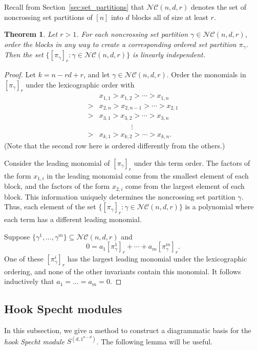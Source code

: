 \documentclass[10pt]{amsart}
\theoremstyle{definition}
\theoremstyle{plain}
\theoremstyle{plain}
\theoremstyle{definition}
\theoremstyle{remark}
\theoremstyle{plain}
\newtheorem{theorem}[cdrthm]{Theorem}
\theoremstyle{plain}
\theoremstyle{plain}
\numberwithin{equation}{section}
\newcommand{\nc}{\mathcal{NC}}
\begin{document}
Recall from Section~\ref{sec:set_partitions} that $\nc(n,d,r)$ denotes the set of noncrossing set partitions of $[n]$ into $d$ blocks all of size at least $r$.

\begin{theorem}\label{thm:linind}
Let $r> 1$. For each noncrossing set partition $\gamma \in \nc(n,d,r)$, order the blocks in any way to create a corresponding ordered set partition $\pi_\gamma$. Then the set $\{ [\pi_\gamma]_r : \gamma \in \nc(n,d,r) \}$ is linearly independent.
\end{theorem}
\begin{proof}
Let $k = n - r d + r$, and let $\gamma\in\nc(n,d,r)$. Order the monomials in $[\pi_\gamma]_r$ under the lexicographic order with 
\begin{align*} &x_{1,1} > x_{1,2} > \cdots > x_{1,n}  \\
> &x_{2,n} > x_{2,n-1} > \cdots >x_{2,1}\\
> &x_{3,1}>x_{3,2} >\cdots>x_{3,n}\\
&\phantom{asasdfdsf} \vdots\\
> &x_{k,1}>x_{k,2} >\cdots > x_{k,n}.
\end{align*}
(Note that the second row here is ordered differently from the others.)

Consider the leading monomial of $[\pi_\gamma]_r$ under this term order. The factors of the form $x_{1,i}$ in the leading monomial come from the smallest element of each block, and the factors of the form $x_{2,i}$ come from the largest element of each block. This information uniquely determines the noncrossing set partition $\gamma$.
Thus, each element of the set $\{ [\pi_\gamma]_r : \gamma \in \nc(n,d,r) \}$ is a polynomial where each term has a different leading monomial. 

Suppose $\{\gamma^1,\ldots,\gamma^m\}\subseteq \nc(n,d,r)$ and \[0=a_1[\pi_\gamma^1]_r+\cdots+a_m[\pi_\gamma^m]_r.\]
One of these $[\pi_\gamma^i]_r$ has the largest leading monomial under the lexicographic ordering, and none of the other invariants contain this monomial. It follows inductively that $a_1=\dots=a_m=0$.
\end{proof}

\subsection{Hook Specht modules}\label{sec:hook}

In this subsection, we give a method to construct a diagrammatic basis for the \emph{hook Specht module} $S^{(d,1^{n-d})}$. The following lemma will be useful.
\end{document}
